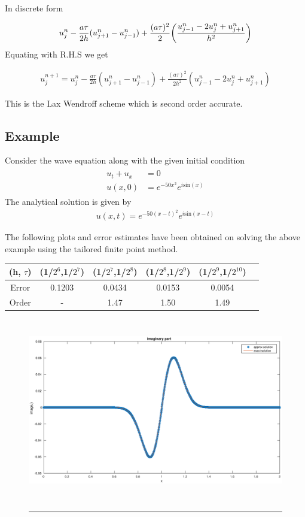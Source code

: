 In discrete form

\begin{align*}
 u_{j}^{n} - \frac{a \tau}{2h} (u_{j+1}^{n}-u_{j-1}^{n}) + \frac{(a \tau)^2}{2}\bigg{(}\frac{u_{j-1}^{n}-2u_{j}^{n}+u_{j+1}^{n}}{h^2}\bigg{)}
\end{align*}
Equating with R.H.S we get

\begin{align*}
 u_{j}^{n+1} = u_{j}^{n} - \frac{a \tau}{2h} (u_{j+1}^{n}-u_{j-1}^{n}) + \frac{(a \tau)^2}{2h^2}(u_{j-1}^{n}-2u_{j}^{n}+u_{j+1}^{n})
\end{align*}

This is the Lax Wendroff scheme which is second order accurate.

\subsection{Example}
Consider the wave equation along with the given initial condition
\begin{align}
 \begin{split}
  u_{t} + u_{x} &= 0\\
   u(x,0) &= e^{-50x^2}e^{i\text{sin}(x)}
 \end{split} 
\end{align}
The analytical solution is given by
\begin{align}
 u(x,t) = e^{-50(x-t)^2}e^{i\text{sin}(x-t)}
\end{align}

The following plots and error estimates have been obtained on solving the above example using the tailored finite point method.\\

\begin{tabular}{|c|c|c|c|c|c|}
   \hline
   (h, $\tau$)  & (1/$2^{6}$,1/$2^{7}$)  & (1/$2^{7}$,1/$2^{8}$) & (1/$2^{8}$,1/$2^{9}$) &  (1/$2^{9}$,1/$2^{10}$)\\
  \hline
  Error  & 0.1203  & 0.0434 & 0.0153 &  0.0054\\
  \hline
  Order & -  &  1.47  & 1.50 & 1.49\\
\hline
\end{tabular}


\begin{figure}[htbp]
	\centering
		\includegraphics[height=8cm]{Figures/imag_OSTFPM_2_1.eps}\\
		\rule{35em}{0.5pt}
	\caption[OSTFPM imaginary part]{}
\end{figure}

